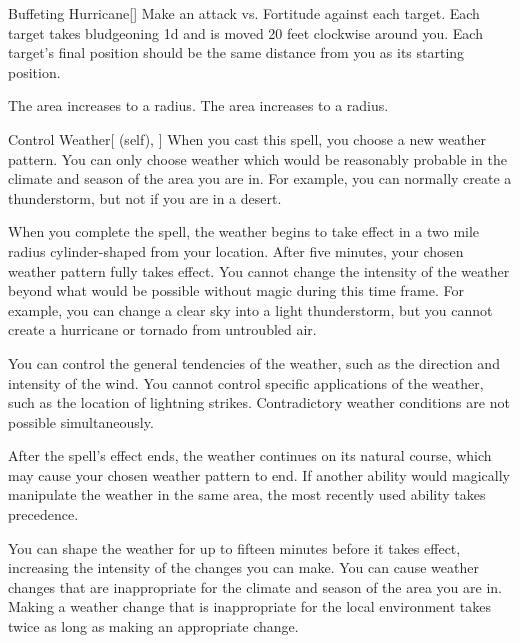 \lowercase{\hypertarget{spell:Buffeting Hurricane}{}}\label{spell:Buffeting Hurricane}
\begin{freeability}[Rank 4]{\hypertarget{spell:Buffeting Hurricane}{Buffeting Hurricane}}[]
Make an attack vs. Fortitude against each target.
\hit Each target takes bludgeoning  \minus1d and is moved 20 feet clockwise around you.
Each target's final position should be the same distance from you as its starting position.

\rankline
{} The area increases to a \arealarge radius.
 The area increases to a \areahuge radius.

\end{freeability}
\vspace{0.25em}



\lowercase{\hypertarget{spell:Control Weather}{}}\label{spell:Control Weather}
\begin{attuneability}[Rank 4]{\hypertarget{spell:Control Weather}{Control Weather}}[ (self), ]
\targetrule
When you cast this spell, you choose a new weather pattern.
You can only choose weather which would be reasonably probable in the climate and season of the area you are in.
For example, you can normally create a thunderstorm, but not if you are in a desert.

When you complete the spell, the weather begins to take effect in a two mile radius cylinder-shaped  from your location.
After five minutes, your chosen weather pattern fully takes effect.
You cannot change the intensity of the weather beyond what would be possible without magic during this time frame.
For example, you can change a clear sky into a light thunderstorm, but you cannot create a hurricane or tornado from untroubled air.

You can control the general tendencies of the weather, such as the direction and intensity of the wind.
You cannot control specific applications of the weather, such as the location of lightning strikes.
Contradictory weather conditions are not possible simultaneously.

After the spell's effect ends, the weather continues on its natural course, which may cause your chosen weather pattern to end.
If another ability would magically manipulate the weather in the same area, the most recently used ability takes precedence.

\rankline
{} You can shape the weather for up to fifteen minutes before it takes effect, increasing the intensity of the changes you can make.
 You can cause weather changes that are inappropriate for the climate and season of the area you are in.
Making a weather change that is inappropriate for the local environment takes twice as long as making an appropriate change.

\end{attuneability}
\vspace{0.25em}



